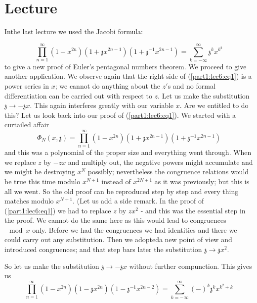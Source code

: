 \chapter{Lecture}\label{part1:lec6}

In\pageoriginale  the last lecture we used the Jacobi formula:

\begin{equation*}
  \prod^\infty_{n=1} (1-x^{2n})
  (1+\mathfrak{z}x^{2n-1})(1+\mathfrak{z}^{-1} x^{2n-1}) =
  \sum^\infty_{k=-\infty} \mathfrak{z}^k x^{k^2} \tag{1}\label{part1:lec6:eq1}
\end{equation*}
to give a new proof of Euler's pentagonal numbers theorem. We proceed
to give another application. We observe again that the right side of
(\ref{part1:lec6:eq1}) is a power series in $x$; we cannot do anything about the $z'$s
and no formal differentiation can be carried out with respect to
$z$. Let us make the substitution $\mathfrak{z} \to -
\mathfrak{z}x$. This again interferes greatly with our variable
$x$. Are we entitled to do this? Let us look back into our proof of
(\ref{part1:lec6:eq1}). We started with a curtailed affair 
$$
\Phi_N (x, \mathfrak{z}) = \prod^\infty_{n=1} (1-x^{2n}) (1+
\mathfrak{z}x^{2n-1}) (1+\mathfrak{z}^{-1} x^{2n-1}) 
$$  
and this was a polynomial of the proper size and everything went
through. When we replace $z$ by $-zx$ and multiply out, the negative
powers might accumulate and we might be destroying $x^N$ possibly;
nevertheless the congruence relations would be true this time modulo
$x^{N+1}$ instead of $x^{2N+1}$ as it was previously; but this is all
we went. So the old proof can be reproduced step by step and every
thing matches modulo $x^{N+1}$. (Let us add a side remark. In the
proof of (\ref{part1:lec6:eq1}) we had to replace $z$ by $zx^2$ - and this was the
essential step in the proof. We cannot do the same here as this would
lead to congruences $\mod x$ only. Before we had the congruences we
had identities and there we could carry out any substitution. Then we
adopted\pageoriginale  a new point of view and introduced congruences; and that step
bars later the substitution $\mathfrak{z} \to \mathfrak{z}x^2$.

So let us make the substitution $\mathfrak{z} \to -\mathfrak{z}x$
without further compunction. This gives us 
$$
\prod^\infty_{n=1} (1-x^{2n})(1-\mathfrak{z}x^{2n})
(1-\mathfrak{z}^{-1}x^{2n-2})= \sum^\infty_{k=-\infty} (-)^{k}
\mathfrak{z}^k x^{k^2+k}
$$

